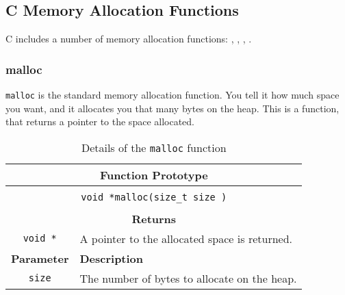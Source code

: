\clearpage
\subsection{C Memory Allocation Functions} %
\label{sub:c_memory_allocation}

C includes a number of memory allocation functions: , , , .

\subsubsection{malloc} %
\label{ssub:malloc}

\texttt{malloc} is the standard memory allocation function. You tell it how much space you want, and it allocates you that many bytes on the heap. This is a function, that returns a pointer to the space allocated.

\begin{table}[h]
  \centering
  \begin{tabular}{|c|p{9.5cm}|}
    \hline
    \multicolumn{2}{|c|}{\textbf{Function Prototype}} \\
    \hline
    \multicolumn{2}{|c|}{} \\
    \multicolumn{2}{|c|}{\texttt{void *malloc(size\_t size )}} \\
    \multicolumn{2}{|c|}{} \\
    \hline
    \multicolumn{2}{|c|}{\textbf{Returns}} \\
    \hline
    \texttt{void *} & A pointer to the allocated space is returned. \\
    \hline
    \textbf{Parameter} & \textbf{Description} \\
    \hline
    \texttt{ size } & The number of bytes to allocate on the heap. \\
    \hline
  \end{tabular}
  \caption{Details of the \texttt{malloc} function}
  \label{tbl:malloc}
\end{table}




